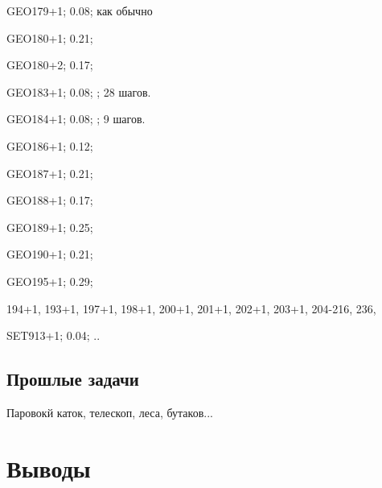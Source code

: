 GEO179+1; 0.08; как обычно

GEO180+1; 0.21;

GEO180+2; 0.17;

GEO183+1; 0.08; ; 28 шагов.

GEO184+1; 0.08; ; 9 шагов.

GEO186+1; 0.12;

GEO187+1; 0.21;

GEO188+1; 0.17;

GEO189+1; 0.25;

GEO190+1; 0.21;

GEO195+1; 0.29;

194+1, 193+1, 197+1, 198+1, 200+1, 201+1, 202+1, 203+1, 204-216, 236,   

SET913+1; 0.04; ..

\subsection{Прошлые задачи}

Паровокй каток, телескоп, леса, бутаков...

\section{Выводы}






